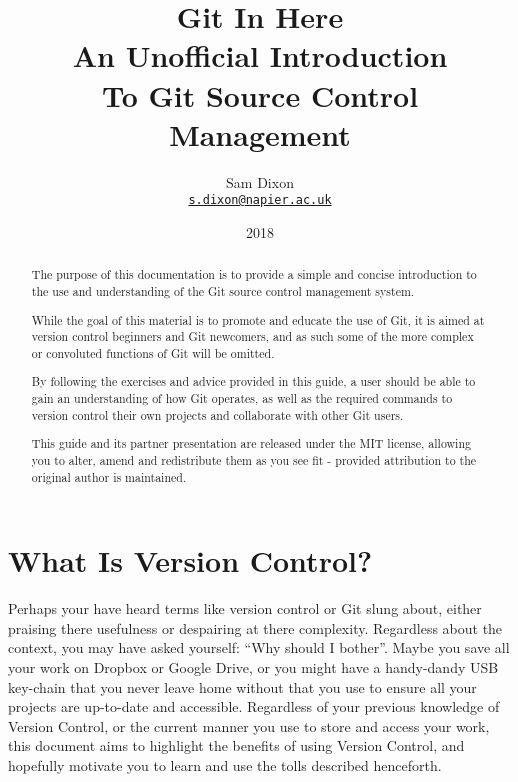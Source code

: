 \documentclass[11pt, a4paper, draft, titlepage]{article}
\begin{document}
\title{ Git In Here\\
\large An Unofficial Introduction 
\\To Git Source Control Management
}

\author{Sam Dixon\\
\texttt{\href{mailto:s.dixon@napier.ac.uk}{s.dixon@napier.ac.uk}}
}

\date{2018} 
\maketitle

\begin{abstract} The purpose of this documentation is to provide a simple and
concise introduction to the use and understanding of the Git source control
management system.

While the goal of this material is to promote and educate the use of Git, it
is aimed at version control beginners and Git newcomers, and as such some of
the more complex or convoluted functions of Git will be omitted.

By following the exercises and advice provided in this guide, a user should be
able to gain an understanding of how Git operates, as well as the required
commands to version control their own projects and collaborate with other Git
users.

This guide and its partner presentation are released under the MIT license,
allowing you to alter, amend and redistribute them as you see fit - provided
attribution to the original author is maintained. 
\end{abstract}


\tableofcontents 
\pagebreak


\section{What Is Version Control?}
Perhaps your have heard terms like version control or Git slung about, either
praising there usefulness or despairing at there complexity. 
Regardless about the context, you may have asked yourself: 
``Why should I bother''.
Maybe you save all your work on Dropbox or Google Drive, or you might have a
handy-dandy USB key-chain that you never leave home without that you use to
ensure all your projects are up-to-date and accessible.
Regardless of your previous knowledge of Version Control, or the current
manner you use to store and access your work, this document aims to highlight
the benefits of using Version Control, and hopefully motivate you to learn and
use the tolls described henceforth.
\end{document}
